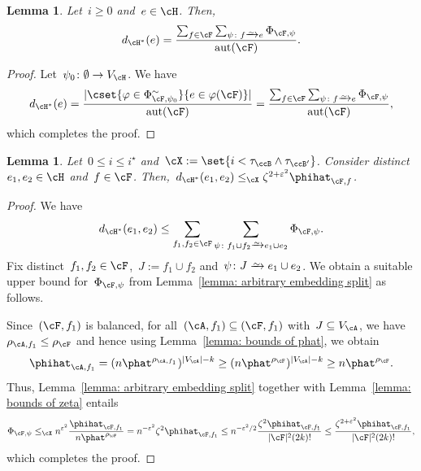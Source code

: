 \documentclass[11pt]{amsart}
\newcommand{\eps}{\varepsilon}
\DeclarePairedDelimiter{\abs}{\lvert}{\rvert}
\newcommand{\Xleq}{\leq_{\cX}}
\def\phi{\varphi}
\newcommand{\bijection}{\mathchoice
	{\xrightarrow{\smash{\raisebox{-3pt}{$\scriptstyle\sim$}}}}%
	{\xrightarrow{\smash{\raisebox{-3pt}{$\scriptstyle\sim$}}}}%
	{\xrightarrow{\smash{\raisebox{-2.5pt}{$\scriptscriptstyle\sim$}}}}%
	{\xrightarrow{\smash{\raisebox{-2.5pt}{$\scriptscriptstyle\sim$}}}}%
}
\DeclareMathOperator{\aut}{aut}
\newtheorem{lemma}[algocf]{Lemma}
\theoremstyle{definition}
\numberwithin{equation}{section}
\begin{document}
	\begin{lemma}\label{lemma: star degrees}
		Let~$i\geq 0$ and~$e\in\cH$.
		Then,
		\begin{equation*}
			d_{\cH^*}(e)=\frac{\sum_{f\in\cF}\sum_{\psi\colon f\bijection e} \Phi_{\cF,\psi}}{\aut(\cF)}.
		\end{equation*}
	\end{lemma}
	
	\begin{proof}
		Let~$\psi_0\colon\emptyset\to V_\cH$.
		We have
		\begin{equation*}
			d_{\cH^*}(e)
			=\frac{\abs{\cset{\phi\in \Phi^\sim_{\cF,\psi_0}}{ e\in\phi(\cF) }}}{\aut(\cF)}
			=\frac{\sum_{f\in\cF}\sum_{\psi\colon f\bijection e}\Phi_{\cF,\psi}}{\aut(\cF)},
		\end{equation*}
		which completes the proof.
		
		
		
	\end{proof}
	
	\begin{lemma}\label{lemma: star codegrees}
		Let~$0\leq i\leq i^\star$ and~$\cX:=\set{ i<\tau_\ccB\wedge\tau_{\ccB'} }$.
		Consider distinct~$e_1,e_2\in\cH$ and~$f\in\cF$.
		Then,~$d_{\cH^*}(e_1,e_2)\Xleq \zeta^{2+\eps^2}\phihat_{\cF,f}$.
	\end{lemma}
	\begin{proof}
		We have
		\begin{equation*}
			d_{\cH^*}(e_1,e_2)\leq \sum_{f_1,f_2\in \cF} \sum_{\psi\colon f_1\cup f_2\bijection e_1\cup e_2} \Phi_{\cF,\psi}.
		\end{equation*}
		Fix distinct~$f_1,f_2\in\cF$,~$J:=f_1\cup f_2$ and~$\psi\colon J\bijection e_1\cup e_2$.
		We obtain a suitable upper bound for~$\Phi_{\cF,\psi}$ from Lemma~\ref{lemma: arbitrary embedding split} as follows.
		
		Since~$(\cF,f_1)$ is balanced, for all~$(\cA,f_1)\subseteq(\cF,f_1)$ with~$J\subseteq V_\cA$, we have~$\rho_{\cA,f_1}\leq \rho_\cF$ and hence using Lemma~\ref{lemma: bounds of phat}, we obtain
		\begin{equation*}
			\phihat_{\cA,f_1}
			=(n\phat^{\rho_{\cA,f_1}})^{\abs{V_\cA}-k}
			\geq (n\phat^{\rho_{\cF}})^{\abs{V_\cA}-k}
			\geq n\phat^{\rho_\cF}.
		\end{equation*}
		Thus, Lemma~\ref{lemma: arbitrary embedding split} together with Lemma~\ref{lemma: bounds of zeta} entails
		\begin{equation*}
			\Phi_{\cF,\psi}
			\Xleq n^{\eps^2}\frac{\phihat_{\cF,f_1}}{n\phat^{\rho_\cF}}
			= n^{-\eps^2}\zeta^2\phihat_{\cF,f_1}
			\leq n^{-\eps^2/2}\frac{\zeta^{2}\phihat_{\cF,f_1}}{\abs{\cF}^2 (2k)!}
			\leq \frac{\zeta^{2+\eps^2}\phihat_{\cF,f_1}}{\abs{\cF}^2 (2k)!},
		\end{equation*}
		which completes the proof.
	\end{proof}
	
\end{document}
